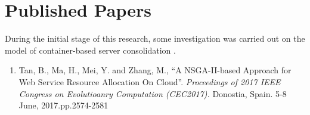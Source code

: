 \section{Published Papers}

During the initial stage of this research, some investigation 
was carried out on the model of container-based server consolidation \cite{Tan:2017tz}. 

\begin{enumerate}
	\item Tan, B., Ma, H., Mei, Y. and Zhang, M., ``A NSGA-II-based Approach for Web Service Resource Allocation On Cloud''. \textit{
	Proceedings of 2017 IEEE Congress on Evolutioanry Computation (CEC2017). } Donostia, Spain. 5-8 June, 2017.pp.2574-2581 



\end{enumerate}

